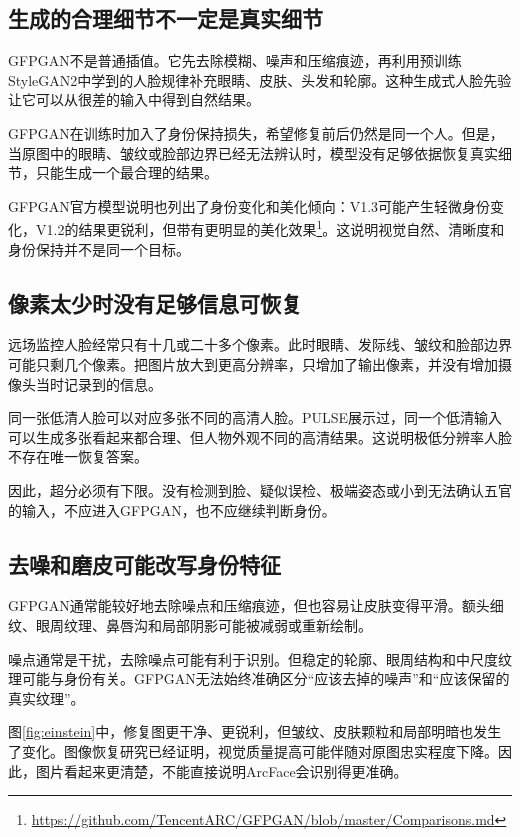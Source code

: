 \documentclass[UTF8,a4paper,11pt]{ctexart}
\begin{document}
\subsection{生成的合理细节不一定是真实细节}

GFPGAN不是普通插值。它先去除模糊、噪声和压缩痕迹，再利用预训练StyleGAN2中学到的人脸规律补充眼睛、皮肤、头发和轮廓\cite{gfpgan}。这种生成式人脸先验让它可以从很差的输入中得到自然结果。

GFPGAN在训练时加入了身份保持损失，希望修复前后仍然是同一个人\cite{gfpgan}。但是，当原图中的眼睛、皱纹或脸部边界已经无法辨认时，模型没有足够依据恢复真实细节，只能生成一个最合理的结果。

GFPGAN官方模型说明也列出了身份变化和美化倾向：V1.3可能产生轻微身份变化，V1.2的结果更锐利，但带有更明显的美化效果\footnote{\url{https://github.com/TencentARC/GFPGAN/blob/master/Comparisons.md}}。这说明视觉自然、清晰度和身份保持并不是同一个目标。

\subsection{像素太少时没有足够信息可恢复}

远场监控人脸经常只有十几或二十多个像素。此时眼睛、发际线、皱纹和脸部边界可能只剩几个像素。把图片放大到更高分辨率，只增加了输出像素，并没有增加摄像头当时记录到的信息。

同一张低清人脸可以对应多张不同的高清人脸。PULSE展示过，同一个低清输入可以生成多张看起来都合理、但人物外观不同的高清结果\cite{pulse}。这说明极低分辨率人脸不存在唯一恢复答案。

因此，超分必须有下限。没有检测到脸、疑似误检、极端姿态或小到无法确认五官的输入，不应进入GFPGAN，也不应继续判断身份。

\subsection{去噪和磨皮可能改写身份特征}

GFPGAN通常能较好地去除噪点和压缩痕迹，但也容易让皮肤变得平滑。额头细纹、眼周纹理、鼻唇沟和局部阴影可能被减弱或重新绘制。

噪点通常是干扰，去除噪点可能有利于识别。但稳定的轮廓、眼周结构和中尺度纹理可能与身份有关。GFPGAN无法始终准确区分“应该去掉的噪声”和“应该保留的真实纹理”。

图\ref{fig:einstein}中，修复图更干净、更锐利，但皱纹、皮肤颗粒和局部明暗也发生了变化。图像恢复研究已经证明，视觉质量提高可能伴随对原图忠实程度下降\cite{perceptiondistortion}。因此，图片看起来更清楚，不能直接说明ArcFace会识别得更准确。
\end{document}
